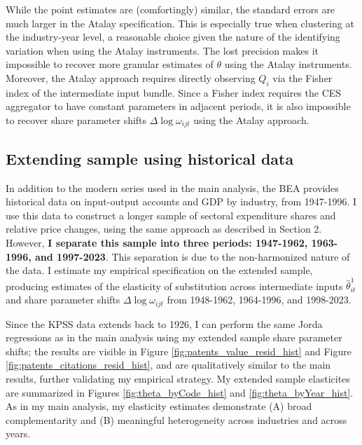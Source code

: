 \documentclass[11pt]{article}
\begin{document}
While the point estimates are (comfortingly) similar, the standard errors are much larger in the Atalay specification. This is especially true when clustering at the industry-year level, a reasonable choice given the nature of the identifying variation when using the Atalay instruments. The lost precision makes it impossible to recover more granular estimates of $\theta$ using the Atalay instruments. Moreover, the Atalay approach requires directly observing $Q_i$ via the Fisher index of the intermediate input bundle. Since a Fisher index requires the CES aggregator to have constant parameters in adjacent periods, it is also impossible to recover share parameter shifts $\Delta \log \omega_{ijt}$ using the Atalay approach.

\subsection{Extending sample using historical data}
\label{ap:historical}

In addition to the modern series used in the main analysis, the BEA provides historical data on input-output accounts and GDP by industry, from 1947-1996. I use this data to construct a longer sample of sectoral expenditure shares and relative price changes, using the same approach as described in Section 2. However, \textbf{I separate this sample into three periods: 1947-1962, 1963-1996, and 1997-2023}. This separation is due to the non-harmonized nature of the data. I estimate my empirical specification on the extended sample, producing estimates of the elasticity of substitution across intermediate inputs $\hat{\theta}^1_{it}$ and share parameter shifts $\Delta \log \omega_{ijt}$ from 1948-1962, 1964-1996, and 1998-2023. 

Since the KPSS data extends back to 1926, I can perform the same Jorda regressions as in the main analysis using my extended sample share parameter shifts; the results are visible in Figure \ref{fig:patents_value_resid_hist} and Figure \ref{fig:patents_citations_resid_hist}, and are qualitatively similar to the main results, further validating my empirical strategy. My extended sample elasticites are summarized in Figures \ref{fig:theta_byCode_hist} and \ref{fig:theta_byYear_hist}. As in my main analysis, my elasticity estimates demonstrate (A) broad complementarity and (B) meaningful heterogeneity across industries and across years. 
\end{document}
